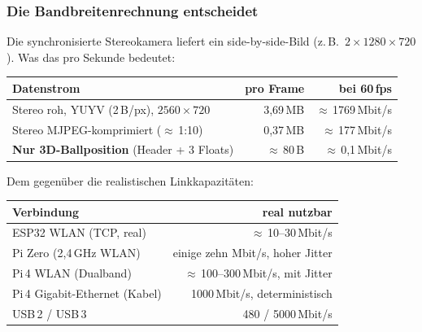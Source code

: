 \subsubsection{Die Bandbreitenrechnung entscheidet}
Die synchronisierte Stereokamera liefert ein side-by-side-Bild
(z.\,B.\ $2\times1280\times720$). Was das pro Sekunde bedeutet:
\begin{longtable}{@{}p{6.2cm}rr@{}}
\toprule
\textbf{Datenstrom} & \textbf{pro Frame} & \textbf{bei 60\,fps} \\
\midrule
Stereo roh, YUYV (2\,B/px), $2560\times720$ & 3{,}69\,MB & $\approx$\,1769\,Mbit/s \\
Stereo MJPEG-komprimiert ($\approx$\,1:10)   & 0{,}37\,MB & $\approx$\,177\,Mbit/s \\
\textbf{Nur 3D-Ballposition} (Header + 3 Floats) & $\approx$\,80\,B & $\approx$\,0{,}1\,Mbit/s \\
\bottomrule
\end{longtable}
\noindent Dem gegenüber die realistischen Linkkapazitäten:
\begin{longtable}{@{}p{6.2cm}r@{}}
\toprule
\textbf{Verbindung} & \textbf{real nutzbar} \\
\midrule
ESP32 WLAN (TCP, real)         & $\approx$\,10--30\,Mbit/s \\
Pi Zero (2{,}4\,GHz WLAN)     & einige zehn Mbit/s, hoher Jitter \\
Pi\,4 WLAN (Dualband)          & $\approx$\,100--300\,Mbit/s, mit Jitter \\
Pi\,4 Gigabit-Ethernet (Kabel) & 1000\,Mbit/s, deterministisch \\
USB\,2 / USB\,3               & 480 / 5000\,Mbit/s \\
\bottomrule
\end{longtable}

